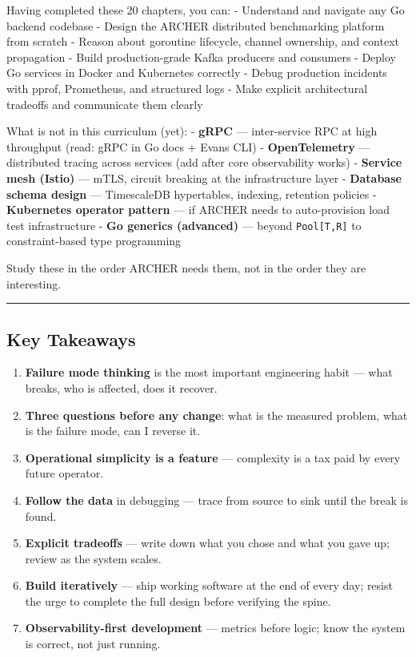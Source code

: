 \documentclass[
]{article}
\providecommand{\tightlist}{%
  \setlength{\itemsep}{0pt}\setlength{\parskip}{0pt}}
\begin{document}
Having completed these 20 chapters, you can: - Understand and navigate
any Go backend codebase - Design the ARCHER distributed benchmarking
platform from scratch - Reason about goroutine lifecycle, channel
ownership, and context propagation - Build production-grade Kafka
producers and consumers - Deploy Go services in Docker and Kubernetes
correctly - Debug production incidents with pprof, Prometheus, and
structured logs - Make explicit architectural tradeoffs and communicate
them clearly

What is not in this curriculum (yet): - \textbf{gRPC} --- inter-service
RPC at high throughput (read: gRPC in Go docs + Evans CLI) -
\textbf{OpenTelemetry} --- distributed tracing across services (add
after core observability works) - \textbf{Service mesh (Istio)} ---
mTLS, circuit breaking at the infrastructure layer - \textbf{Database
schema design} --- TimescaleDB hypertables, indexing, retention policies
- \textbf{Kubernetes operator pattern} --- if ARCHER needs to
auto-provision load test infrastructure - \textbf{Go generics
(advanced)} --- beyond \texttt{Pool{[}T,R{]}} to constraint-based type
programming

Study these in the order ARCHER needs them, not in the order they are
interesting.

\begin{center}\rule{0.5\linewidth}{0.5pt}\end{center}

\hypertarget{key-takeaways-3}{%
\subsection{Key Takeaways}\label{key-takeaways-3}}

\begin{enumerate}
\def\labelenumi{\arabic{enumi}.}
\tightlist
\item
  \textbf{Failure mode thinking} is the most important engineering habit
  --- what breaks, who is affected, does it recover.
\item
  \textbf{Three questions before any change}: what is the measured
  problem, what is the failure mode, can I reverse it.
\item
  \textbf{Operational simplicity is a feature} --- complexity is a tax
  paid by every future operator.
\item
  \textbf{Follow the data} in debugging --- trace from source to sink
  until the break is found.
\item
  \textbf{Explicit tradeoffs} --- write down what you chose and what you
  gave up; review as the system scales.
\item
  \textbf{Build iteratively} --- ship working software at the end of
  every day; resist the urge to complete the full design before
  verifying the spine.
\item
  \textbf{Observability-first development} --- metrics before logic;
  know the system is correct, not just running.
\end{enumerate}
\end{document}
